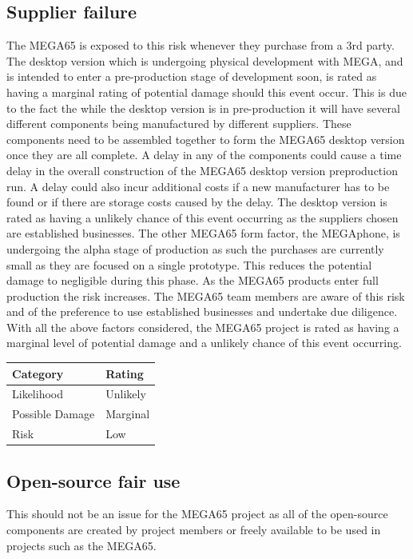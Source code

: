 \subsection{Supplier failure}
The MEGA65 is exposed to this risk whenever they purchase from a 3rd party. The desktop version which is undergoing physical development with MEGA, and is intended to enter a pre-production stage of development soon, is rated as having a marginal rating of potential damage should this event occur. This is due to the fact the while the desktop version is in pre-production it will have several different components being manufactured by different suppliers. These components need to be assembled together to form the MEGA65 desktop version once they are all complete. A delay in any of the components could cause a time delay in the overall construction of the MEGA65 desktop version preproduction run. A delay could also incur additional costs if a new manufacturer has to be found or if there are storage costs caused by the delay. The desktop version is rated as having a unlikely chance of this event occurring as the suppliers chosen are established businesses. The other MEGA65 form factor, the MEGAphone, is undergoing the alpha stage of production as such the purchases are currently small as they are focused on a single prototype. This reduces the potential damage to negligible during this phase. As the MEGA65 products enter full production the risk increases. The MEGA65 team members are aware of this risk and of the preference to use established businesses and undertake due diligence. With all the above factors considered, the MEGA65 project is rated as having a marginal level of potential damage and a unlikely chance of this event occurring. \\

\begin{tabular}{l|l} %
    	\textbf{Category} 	&	\textbf{Rating} \\
      \hline
     Likelihood			&	Unlikely \\
     Possible Damage 	& 	Marginal \\
     Risk 				&	Low		\\	
    \end{tabular}


\subsection{Open-source fair use}
This should not be an issue for the MEGA65 project as all of the open-source components are created by project members or freely available to be used in projects such as the MEGA65. \\

